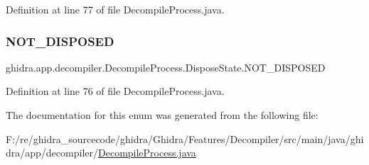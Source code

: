 Definition at line 77 of file Decompile\+Process.\+java.

\mbox{\label{enumghidra_1_1app_1_1decompiler_1_1_decompile_process_1_1_dispose_state_aa39c6635250fd783afa5ed6e728310b3}} 
\subsubsection{\texorpdfstring{NOT\_DISPOSED}{NOT\_DISPOSED}}
{\footnotesize\ttfamily ghidra.\+app.\+decompiler.\+Decompile\+Process.\+Dispose\+State.\+N\+O\+T\+\_\+\+D\+I\+S\+P\+O\+S\+ED}



Definition at line 76 of file Decompile\+Process.\+java.



The documentation for this enum was generated from the following file\+:\begin{DoxyCompactItemize}
\item 
F\+:/re/ghidra\+\_\+sourcecode/ghidra/\+Ghidra/\+Features/\+Decompiler/src/main/java/ghidra/app/decompiler/\mbox{\hyperlink{_decompile_process_8java}{Decompile\+Process.\+java}}\end{DoxyCompactItemize}

